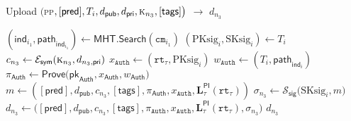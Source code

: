 \begin{algorithm}
	\caption{\textsf{Upload} $\big($\textsc{pp}$, [\textsf{pred}], T_i, d_{\mathsf{pub}}, d_{\mathsf{pri}}, \textsc{k}_{n_3}, [\textsf{tags}]  \big)$ $\rightarrow$ $d_{n_3}$}\label{alg:Upload}
	\begin{algorithmic}[1]
		\State $(\mathsf{ind}_{i_1}, \mathsf{path}_{\mathsf{ind}_{i_1}}) \gets \mathsf{MHT}.\mathsf{Search}(\texttt{cm}_{i_1})$
		\State $(\text{PKsig}_{i}, \text{SKsig}_{i}) \gets T_i$
		\State $c_{n_3} \gets \mathcal{E}_\mathsf{sym}(\textsc{k}_{n_3}, d_{{n_3}, \mathsf{pri}} )$
		\State $x_\texttt{Auth} \gets (\texttt{rt}_\tau, \text{PKsig}_{i})$
		\State $w_\texttt{Auth} \gets (T_i, \mathsf{path}_{\mathsf{ind}_{i}})$
		\State $\pi_{\textsf{Auth}} \gets \textsf{Prove}\big(\mathsf{pk}_{\textsf{Auth}}, x_{\textsf{Auth}}, w_{\textsf{Auth}}\big)$
		\State $m \gets ([\textsf{pred}], d_{\mathsf{pub}}, c_{n_3}, [\textsf{tags}], \pi_{\textsf{Auth}}, x_\texttt{Auth}, \mathbf{L}_\tau^\mathsf{PI}(\texttt{rt}_\tau))$
		\State $\sigma_{n_3} \gets \mathcal{S}_\mathsf{sig}\big(\text{SKsig}_{i}, m \big)$
		\State $d_{n_3} \gets \big([\textsf{pred}],  d_{\mathsf{pub}}, c_{n_3},
		[\textsf{tags}], \pi_\texttt{Auth}, x_\texttt{Auth}, \mathbf{L}_\tau^\mathsf{PI}(\texttt{rt}_\tau), \sigma_{n_3}\big)$
		\State \Return $d_{n_3}$
	\end{algorithmic}
\end{algorithm}



